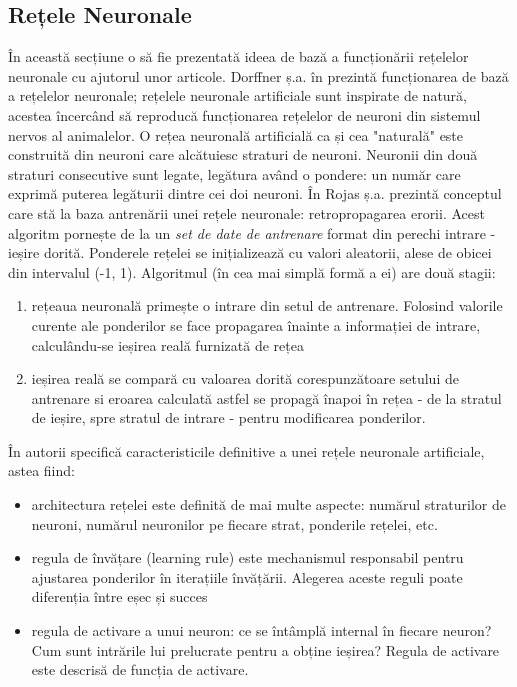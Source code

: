 \subsection{Rețele Neuronale}
În această secțiune o să fie prezentată ideea de bază a funcționării rețelelor neuronale cu ajutorul unor articole.\newline
Dorffner ș.a. în \cite{dorffner1996neural} prezintă funcționarea de bază a rețelelor neuronale; rețelele neuronale artificiale sunt inspirate de natură, acestea încercând să reproducă funcționarea rețelelor de neuroni din sistemul nervos al animalelor. O rețea neuronală artificială ca și cea "naturală" este construită din neuroni care alcătuiesc straturi de neuroni. Neuronii din două straturi consecutive sunt legate, legătura având o pondere: un număr care exprimă puterea legăturii dintre cei doi neuroni.\newline
În \cite{rojas1996backpropagation} Rojas ș.a. prezintă conceptul care stă la baza antrenării unei rețele neuronale: retropropagarea erorii. 	Acest algoritm pornește de la un \textit{set de date de antrenare} format din perechi intrare - ieșire dorită. Ponderele rețelei se inițializează cu valori aleatorii, alese de obicei din intervalul (-1, 1).\newline
Algoritmul (în cea mai simplă formă a ei) are două stagii:
\begin{enumerate}
	\item rețeaua neuronală primește o intrare din setul de antrenare. Folosind valorile curente ale ponderilor se face propagarea înainte a informației de intrare, calculându-se ieșirea reală furnizată de rețea
	\item ieșirea reală se compară cu valoarea dorită corespunzătoare setului de antrenare si eroarea calculată astfel se propagă înapoi în rețea - de la stratul de ieșire, spre stratul de intrare - pentru modificarea ponderilor.
\end{enumerate}
În \cite{aima} autorii specifică caracteristicile definitive a unei rețele neuronale artificiale, astea fiind:
\begin{itemize}
	\item architectura rețelei este definită de mai multe aspecte: numărul straturilor de neuroni, numărul neuronilor pe fiecare strat, ponderile rețelei, etc.
	\item regula de învățare (learning rule) este mechanismul responsabil pentru ajustarea ponderilor în iterațiile învățării. Alegerea aceste reguli poate diferenția între eșec și succes
	\item regula de activare a unui neuron: ce se întâmplă internal în fiecare neuron? Cum sunt intrările lui prelucrate pentru a obține ieșirea? Regula de activare este descrisă de funcția de activare.
\end{itemize}
